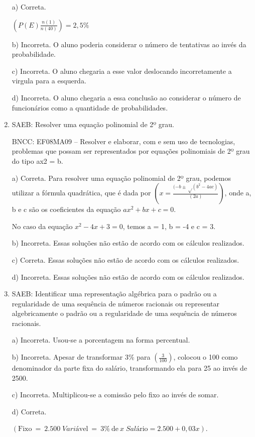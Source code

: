 \begin{enumerate}
a) Correta.

$(P(E)\frac{n(1)}{n(40)})= 2,5\%$

b) Incorreta. O aluno poderia considerar o número de tentativas ao
invés da probabilidade.

c) Incorreta. O aluno chegaria a esse valor deslocando
incorretamente a virgula para a esquerda.

d) Incorreta. O aluno chegaria a essa conclusão ao considerar o
número de funcionários como a quantidade de probabilidades.

\item SAEB: Resolver uma equação polinomial de 2º grau.

BNCC: EF08MA09 -- Resolver e elaborar, com e sem uso de tecnologias,
problemas que possam ser representados por equações polinomiais de 2º
grau do tipo ax2 = b.

a) Correta. Para resolver uma equação polinomial de 2º grau,
podemos utilizar a fórmula quadrática, que é dada por
$(x = \frac{(-b ± √(b^2 - 4ac)} {(2a)})$, onde a, b e c são os
coeficientes da equação $ax^2 + bx + c = 0$.

No caso da equação $x^2 - 4x + 3 = 0$, temos a = 1, b = -4 e c = 3.

b) Incorreta. Essas soluções não estão de acordo com os cálculos
realizados.

c) Correta. Essas soluções não estão de acordo com os cálculos
realizados.

d) Incorreta. Essas soluções não estão de acordo com os cálculos
realizados.

\item SAEB: Identificar uma representação algébrica para o padrão ou a
regularidade de uma sequência de números racionais ou representar
algebricamente o padrão ou a regularidade de uma sequência de números
racionais.

a) Incorreta. Usou-se a porcentagem na forma percentual.

b) Incorreta. Apesar de transformar 3\% para $(\frac{3}{100})$,
colocou o 100 como denominador da parte fixa do salário, transformando
ela para 25 ao invés de 2500.

c) Incorreta. Multiplicou-se a comissão pelo fixo ao invés de somar.

d) Correta. 

$(\text{Fixo}\ = \ 2.500 \; {Vari}á\text{vel}\  = \ 3\%\ \text{de}\ x \; {Sal}á\text{rio} = 2.500 + 0,03x)$.
\end{enumerate}


